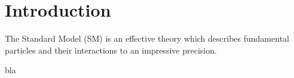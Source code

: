 \chapter{Introduction}
The Standard Model (\Gls{SM}) is an effective theory which describes fundamental particles and their interactions to an impressive precision. 

bla
